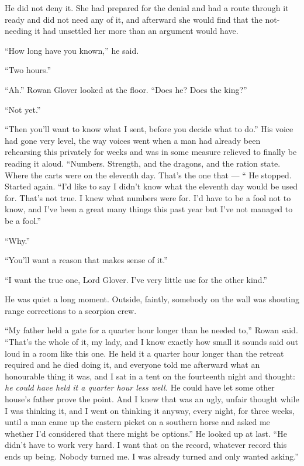 He did not deny it. She had prepared for the denial and had a route through it ready and did not need any of it, and afterward she would find that the not-needing it had unsettled her more than an argument would have.

“How long have you known,” he said.

“Two hours.”

“Ah.” Rowan Glover looked at the floor. “Does he? Does the king?”

“Not yet.”

“Then you’ll want to know what I sent, before you decide what to do.” His voice had gone very level, the way voices went when a man had already been rehearsing this privately for weeks and was in some measure relieved to finally be reading it aloud. “Numbers. Strength, and the dragons, and the ration state. Where the carts were on the eleventh day. That’s the one that — “ He stopped. Started again. “I’d like to say I didn’t know what the eleventh day would be used for. That’s not true. I knew what numbers were for. I’d have to be a fool not to know, and I’ve been a great many things this past year but I’ve not managed to be a fool.”

“Why.”

“You’ll want a reason that makes sense of it.”

“I want the true one, Lord Glover. I’ve very little use for the other kind.”

He was quiet a long moment. Outside, faintly, somebody on the wall was shouting range corrections to a scorpion crew.

“My father held a gate for a quarter hour longer than he needed to,” Rowan said. “That’s the whole of it, my lady, and I know exactly how small it sounds said out loud in a room like this one. He held it a quarter hour longer than the retreat required and he died doing it, and everyone told me afterward what an honourable thing it was, and I sat in a tent on the fourteenth night and thought: \textit{he could have held it a quarter hour less well.} He could have let some other house’s father prove the point. And I knew that was an ugly, unfair thought while I was thinking it, and I went on thinking it anyway, every night, for three weeks, until a man came up the eastern picket on a southern horse and asked me whether I’d considered that there might be options.” He looked up at last. “He didn’t have to work very hard. I want that on the record, whatever record this ends up being. Nobody turned me. I was already turned and only wanted asking.”

